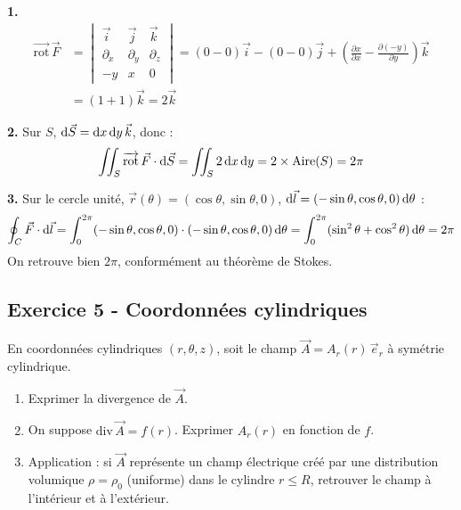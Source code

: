 \documentclass[12pt,a4paper]{article}
\begin{document}
\begin{boitecorrige}
\textbf{1.}
\begin{align*}
\overrightarrow{\text{rot}}\,\vec{F} &= \begin{vmatrix}\vec{i}&\vec{j}&\vec{k}\\\partial_x&\partial_y&\partial_z\\-y&x&0\end{vmatrix}
= (0-0)\vec{i}-(0-0)\vec{j}+\left(\frac{\partial x}{\partial x}-\frac{\partial(-y)}{\partial y}\right)\vec{k} \\
&= (1+1)\vec{k} = 2\vec{k}
\end{align*}

\textbf{2.} Sur $S$, $\mathrm{d}\vec{S}=\mathrm{d} x\,\mathrm{d} y\,\vec{k}$, donc :
\[
\iint_S \overrightarrow{\text{rot}}\,\vec{F}\cdot\mathrm{d}\vec{S} = \iint_S 2\,\mathrm{d} x\,\mathrm{d} y = 2\times\text{Aire}(S) = 2\pi
\]

\textbf{3.} Sur le cercle unité, $\vec{r}(\theta)=(\cos\theta,\sin\theta,0)$, $\mathrm{d}\vec{l}=(-\sin\theta,\cos\theta,0)\,\mathrm{d}\theta$ :
\[
\oint_C \vec{F}\cdot\mathrm{d}\vec{l} = \int_0^{2\pi}(-\sin\theta,\cos\theta,0)\cdot(-\sin\theta,\cos\theta,0)\,\mathrm{d}\theta = \int_0^{2\pi}(\sin^2\theta+\cos^2\theta)\,\mathrm{d}\theta = 2\pi
\]
On retrouve bien $2\pi$, conformément au théorème de Stokes.
\end{boitecorrige}

\subsection*{Exercice 5 - Coordonnées cylindriques \niveau{\difficile}}

\begin{boiteexercice}
En coordonnées cylindriques $(r,\theta,z)$, soit le champ $\vec{A} = A_r(r)\,\vec{e}_r$ à symétrie cylindrique.
\begin{enumerate}
  \item Exprimer la divergence de $\vec{A}$.
  \item On suppose $\text{div}\,\vec{A} = f(r)$. Exprimer $A_r(r)$ en fonction de $f$.
  \item Application : si $\vec{A}$ représente un champ électrique créé par une distribution volumique $\rho = \rho_0$ (uniforme) dans le cylindre $r\leq R$, retrouver le champ à l'intérieur et à l'extérieur.
\end{enumerate}
\end{boiteexercice}
\end{document}
